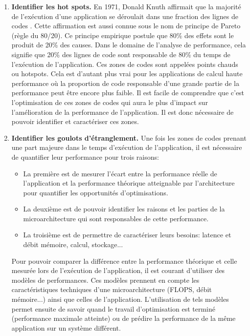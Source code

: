         \begin{enumerate}
            
            \item \textbf{Identifier les hot spots.} En 1971, Donald Knuth affirmait que la majorité de l’exécution d'une application se déroulait dans une fraction des lignes de codes \cite{knuth1971empirical}. Cette affirmation est aussi connue sous le nom de principe de Pareto  (règle du 80/20). Ce principe empirique postule que 80\% des effets sont le produit de 20\% des causes. Dans le domaine de l’analyse de performance, cela signifie que 20\% des lignes de code sont responsable de 80\% du temps de l'exécution de l'application. Ces zones de codes sont appelées points chauds ou \glspl{hotspot}. Cela est d’autant plus vrai pour les applications de calcul haute performance où la proportion de code responsable d'une grande partie de la performance peut être encore plus faible. Il est facile de comprendre que c'est l'optimisation de ces zones de codes qui aura le plus d'impact sur l'amélioration de la performance de l'application. Il est donc nécessaire de pouvoir identifier et caractériser ces zones.
            
            \item \textbf{Identifier les goulots d'étranglement.} Une fois les zones de codes prenant une part majeure dans le temps d'exécution de l'application, il est nécessaire de quantifier leur performance pour trois raisons: 
            \begin{itemize}
                \item La première est de mesurer l'écart entre la performance réelle de l'application et la performance théorique atteignable par l'architecture pour quantifier les opportunités d'optimisations. 
                \item La deuxième est de pouvoir identifier les raisons et les parties de la microarchitecture qui sont responsables de cette performance. 
                \item La troisième est de permettre de caractériser leurs besoins: latence et débit mémoire, calcul, stockage...
            \end{itemize}
            Pour pouvoir comparer la différence entre la performance théorique et celle mesurée lors de l'exécution de l'application, il est courant d'utiliser des modèles de performances. Ces modèles prennent en compte les caractéristiques techniques d'une microarchitecture (FLOPS, débit mémoire...) ainsi que celles de l'application. L'utilisation de tels modèles permet ensuite de savoir quand le travail d'optimisation est terminé (performance maximale atteinte) ou de prédire la performance de la même application sur un système différent.
        \end{enumerate}
        
